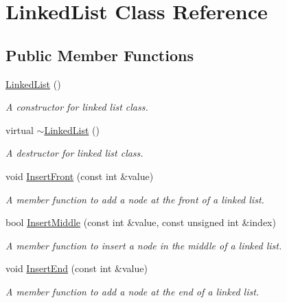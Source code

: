 \hypertarget{classLinkedList}{}\section{Linked\+List Class Reference}
\label{classLinkedList}
\subsection*{Public Member Functions}
\begin{DoxyCompactItemize}
\item 
\mbox{\label{classLinkedList_afe7f78983e173f8018927cf2ad11a5aa}} 
\hyperlink{classLinkedList_afe7f78983e173f8018927cf2ad11a5aa}{Linked\+List} ()
\begin{DoxyCompactList}\small\item\em A constructor for linked list class. \end{DoxyCompactList}\item 
\mbox{\label{classLinkedList_a6bbf7d5e45c107ddad9cb3e8f7c32dd0}} 
virtual \hyperlink{classLinkedList_a6bbf7d5e45c107ddad9cb3e8f7c32dd0}{$\sim$\+Linked\+List} ()
\begin{DoxyCompactList}\small\item\em A destructor for linked list class. \end{DoxyCompactList}\item 
void \hyperlink{classLinkedList_a37f55fb8cfe1af658a49670c9674c1b1}{Insert\+Front} (const int \&value)
\begin{DoxyCompactList}\small\item\em A member function to add a node at the front of a linked list. \end{DoxyCompactList}\item 
bool \hyperlink{classLinkedList_ac9ec998fedd482a4f18ebf8c6a1204bd}{Insert\+Middle} (const int \&value, const unsigned int \&index)
\begin{DoxyCompactList}\small\item\em A member function to insert a node in the middle of a linked list. \end{DoxyCompactList}\item 
void \hyperlink{classLinkedList_a4e97c2797b1bf8d9e8bbd800af2ddbd9}{Insert\+End} (const int \&value)
\begin{DoxyCompactList}\small\item\em A member function to add a node at the end of a linked list. \end{DoxyCompactList}\item 

\end{DoxyCompactItemize}
